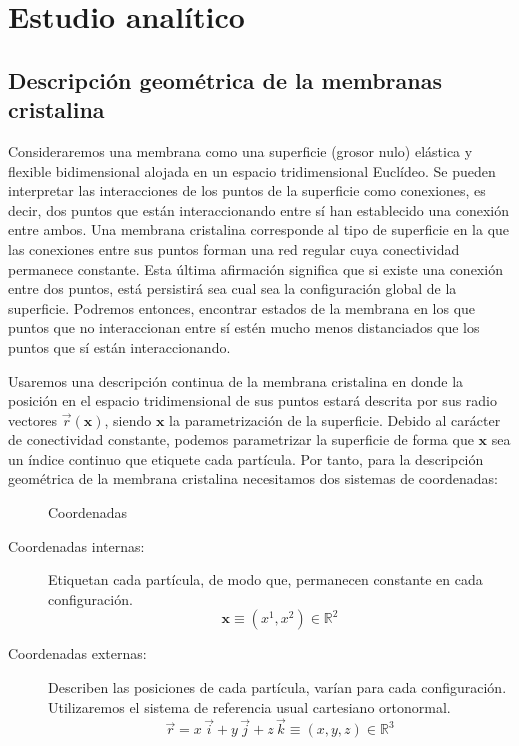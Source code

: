 
\chapter{Estudio analítico}

\section{Descripción geométrica de la membranas cristalina}

Consideraremos una membrana como una superficie (grosor nulo) elástica y flexible
bidimensional alojada en un espacio tridimensional Euclídeo. 
Se pueden interpretar las interacciones de los puntos de la superficie como
conexiones, es decir, dos puntos que están interaccionando entre sí han
establecido una conexión entre ambos. Una membrana cristalina corresponde al
tipo de superficie en la que las conexiones entre sus puntos forman una red
regular cuya conectividad permanece constante. Esta última afirmación
significa que si existe una conexión entre dos puntos, está persistirá sea
cual sea la configuración global de la superficie. Podremos entonces,
encontrar estados de la membrana en los que puntos que no interaccionan entre
sí estén mucho menos distanciados que los puntos que sí están interaccionando.

Usaremos una descripción continua de la membrana cristalina en donde la
posición en el espacio tridimensional de sus puntos estará descrita por sus
radio vectores $\vec{r}(\mathbf{x})$, siendo $\mathbf{x}$ la parametrización
de la superficie. Debido al carácter de conectividad constante, podemos
parametrizar la superficie de forma que $\mathbf{x}$ sea un índice continuo
que etiquete cada partícula. Por tanto, para la descripción geométrica de la
membrana cristalina necesitamos dos sistemas de coordenadas:

\begin{figure}[h]
\centering
{}
\quad
{}
\caption{Coordenadas }
\end{figure}

\begin{description}
\item[Coordenadas internas:] Etiquetan cada partícula, de modo que, permanecen
  constante en cada configuración.
  \begin{equation*}
  \mathbf{x}\equiv (x^1,x^2)\in \mathbb{R}^2
  \end{equation*}
\item[Coordenadas externas:] Describen las posiciones de cada partícula,
  varían para cada configuración. Utilizaremos el sistema de referencia usual
  cartesiano ortonormal.
  \begin{equation*}
    \vec{r}=x\,\vec{i}+y\,\vec{j}+z\,\vec{k}\equiv (x,y,z)\in \mathbb{R}^3
  \end{equation*}
\end{description}

